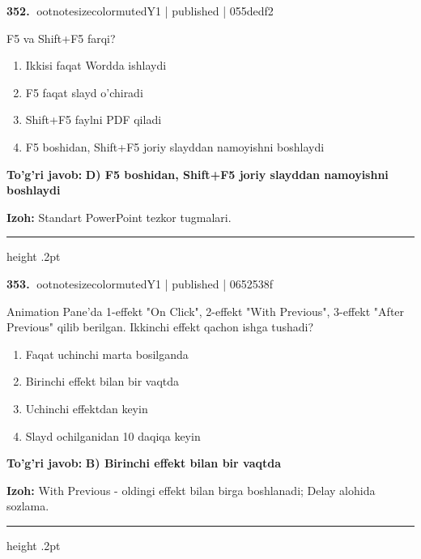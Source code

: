 \documentclass[10pt,a4paper]{article}
\begin{document}
\textbf{\color{ink}352.} {ootnotesizecolor{muted}Y1 | published | 055dedf2}
\par
F5 va Shift+F5 farqi?
\begin{enumerate}[label=\Alph*),leftmargin=9mm]
\item Ikkisi faqat Wordda ishlaydi
\item F5 faqat slayd o'chiradi
\item Shift+F5 faylni PDF qiladi
\item F5 boshidan, Shift+F5 joriy slayddan namoyishni boshlaydi
\end{enumerate}
\begin{tcolorbox}[enhanced,breakable,colback=teal!4,colframe=teal!55!black,boxrule=0.45pt,arc=1.2mm,left=2.8mm,right=2.8mm,top=2mm,bottom=2mm]
\textbf{\color{teal}To'g'ri javob:} \textbf{D) F5 boshidan, Shift+F5 joriy slayddan namoyishni boshlaydi}
\par\smallskip
\textbf{Izoh:} Standart PowerPoint tezkor tugmalari.
\end{tcolorbox}
\vspace{2mm}\hrule height .2pt\vspace{2mm}

\textbf{\color{ink}353.} {ootnotesizecolor{muted}Y1 | published | 0652538f}
\par
Animation Pane'da 1-effekt "On Click", 2-effekt "With Previous", 3-effekt "After Previous" qilib berilgan. Ikkinchi effekt qachon ishga tushadi?
\begin{enumerate}[label=\Alph*),leftmargin=9mm]
\item Faqat uchinchi marta bosilganda
\item Birinchi effekt bilan bir vaqtda
\item Uchinchi effektdan keyin
\item Slayd ochilganidan 10 daqiqa keyin
\end{enumerate}
\begin{tcolorbox}[enhanced,breakable,colback=teal!4,colframe=teal!55!black,boxrule=0.45pt,arc=1.2mm,left=2.8mm,right=2.8mm,top=2mm,bottom=2mm]
\textbf{\color{teal}To'g'ri javob:} \textbf{B) Birinchi effekt bilan bir vaqtda}
\par\smallskip
\textbf{Izoh:} With Previous - oldingi effekt bilan birga boshlanadi; Delay alohida sozlama.
\end{tcolorbox}
\vspace{2mm}\hrule height .2pt\vspace{2mm}
\end{document}

